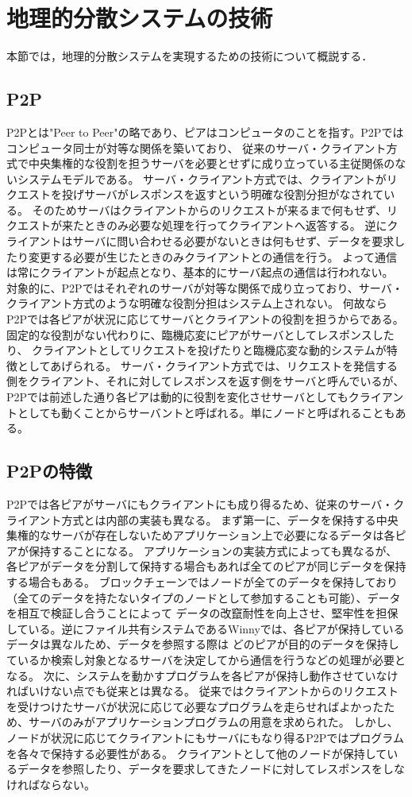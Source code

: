 \section{地理的分散システムの技術}
本節では，地理的分散システムを実現するための技術について概説する．

\subsection{P2P}
P2Pとは"Peer to Peer"の略であり、ピアはコンピュータのことを指す。P2Pではコンピュータ同士が対等な関係を築いており、
従来のサーバ・クライアント方式で中央集権的な役割を担うサーバを必要とせずに成り立っている主従関係のないシステムモデルである。
サーバ・クライアント方式では、クライアントがリクエストを投げサーバがレスポンスを返すという明確な役割分担がなされている。
そのためサーバはクライアントからのリクエストが来るまで何もせず、リクエストが来たときのみ必要な処理を行ってクライアントへ返答する。
逆にクライアントはサーバに問い合わせる必要がないときは何もせず、データを要求したり変更する必要が生じたときのみクライアントとの通信を行う。
よって通信は常にクライアントが起点となり、基本的にサーバ起点の通信は行われない。
対象的に、P2Pではそれぞれのサーバが対等な関係で成り立っており、サーバ・クライアント方式のような明確な役割分担はシステム上されない。
何故ならP2Pでは各ピアが状況に応じてサーバとクライアントの役割を担うからである。固定的な役割がない代わりに、臨機応変にピアがサーバとしてレスポンスしたり、
クライアントとしてリクエストを投げたりと臨機応変な動的システムが特徴としてあげられる。
サーバ・クライアント方式では、リクエストを発信する側をクライアント、それに対してレスポンスを返す側をサーバと呼んでいるが、
P2Pでは前述した通り各ピアは動的に役割を変化させサーバとしてもクライアントとしても動くことからサーバントと呼ばれる。単にノードと呼ばれることもある。

\subsection{P2Pの特徴}
P2Pでは各ピアがサーバにもクライアントにも成り得るため、従来のサーバ・クライアント方式とは内部の実装も異なる。
まず第一に、データを保持する中央集権的なサーバが存在しないためアプリケーション上で必要になるデータは各ピアが保持することになる。
アプリケーションの実装方式によっても異なるが、各ピアがデータを分割して保持する場合もあれば全てのピアが同じデータを保持する場合もある。
ブロックチェーンではノードが全てのデータを保持しており（全てのデータを持たないタイプのノードとして参加することも可能）、データを相互で検証し合うことによって
データの改竄耐性を向上させ、堅牢性を担保している。逆にファイル共有システムであるWinnyでは、各ピアが保持しているデータは異なルため、データを参照する際は
どのピアが目的のデータを保持しているか検索し対象となるサーバを決定してから通信を行うなどの処理が必要となる。
次に、システムを動かすプログラムを各ピアが保持し動作させていなければいけない点でも従来とは異なる。
従来ではクライアントからのリクエストを受けつけたサーバが状況に応じて必要なプログラムを走らせればよかったため、サーバのみがアプリケーションプログラムの用意を求められた。
しかし、ノードが状況に応じてクライアントにもサーバにもなり得るP2Pではプログラムを各々で保持する必要性がある。
クライアントとして他のノードが保持しているデータを参照したり、データを要求してきたノードに対してレスポンスをしなければならない。

